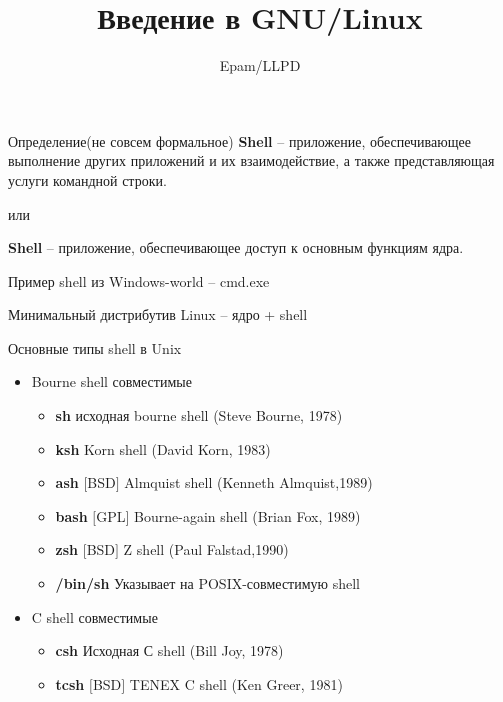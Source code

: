 \documentclass[ignorenonframetext, professionalfonts, hyperref={pdftex, unicode}]{beamer}
\title{Введение в GNU/Linux}
\author{Epam/LLPD}
\begin{document}


\frame{
	\frametitle{}
	\titlepage
	\vspace{-0.5cm}
	\begin{center}
	\end{center}
}
\frame{
	\tableofcontents
}

\begin{frame}[fragile]{Определение(не совсем формальное)}
\textbf{Shell} -- приложение, обеспечивающее выполнение других приложений и их взаимодействие, а также представляющая услуги командной строки. 
\begin{center}
  или
\end{center}
\textbf{Shell} -- приложение, обеспечивающее доступ к основным функциям ядра.

\pause
\vspace{0.5in}
Пример shell из Windows-world -- cmd.exe
\vspace{0.5in}

Минимальный дистрибутив Linux -- ядро + shell 

\end{frame}
\begin{frame}[fragile]{Основные типы shell в Unix}
  \begin{itemize}
    \item Bourne shell совместимые
      \begin{itemize}
        \item \textbf{sh} исходная bourne shell (Steve Bourne, 1978)
        \item \textbf{ksh} Korn shell (David Korn, 1983)
        \item \textbf{ash} $[$BSD$]$ Almquist shell (Kenneth Almquist,1989)  
        \item \textbf{bash} $[$GPL$]$ Bourne-again shell (Brian Fox, 1989)
        \item \textbf{zsh} $[$BSD$]$ Z shell (Paul Falstad,1990)
        \item \textbf{/bin/sh} Указывает на POSIX-совместимую shell
      \end{itemize}
  \item C shell совместимые
      \begin{itemize}
        \item \textbf{csh}  Исходная С shell (Bill Joy, 1978)
        \item \textbf{tcsh} $[$BSD$]$ TENEX C shell (Ken Greer, 1981)
       \end{itemize}
  \end{itemize}
\end{frame}
\end{document}
